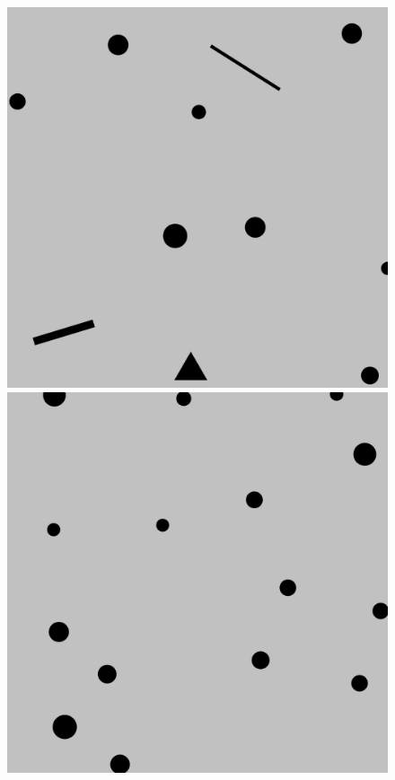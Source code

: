 \documentclass{beamer}
\begin{document}
\begin{frame}
\begin{figure}[H]
\begin{columns}
\begin{column}{0.14\textwidth}
							\includegraphics[width=1\linewidth]{graphics/test_model_11_1.png}
							\includegraphics[width=1\linewidth]{graphics/test_model_15_1.png}
						\end{column}

\end{columns}
\end{figure}
\end{frame}
\end{document}

